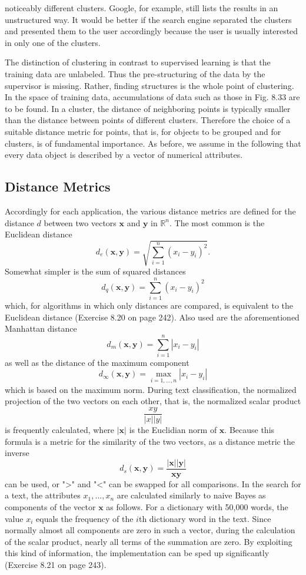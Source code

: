 \documentclass[10pt]{book}
\begin{document}
noticeably different clusters. Google, for example, still lists the results in an unstructured way. It would be better if the search engine separated the clusters and presented them to the user accordingly because the user is usually interested in only one of the clusters.

The distinction of clustering in contrast to supervised learning is that the training data are unlabeled. Thus the pre-structuring of the data by the supervisor is missing. Rather, finding structures is the whole point of clustering. In the space of training data, accumulations of data such as those in Fig. 8.33 are to be found. In a cluster, the distance of neighboring points is typically smaller than the distance between points of different clusters. Therefore the choice of a suitable distance metric for points, that is, for objects to be grouped and for clusters, is of fundamental importance. As before, we assume in the following that every data object is described by a vector of numerical attributes.

\subsection{Distance Metrics}
Accordingly for each application, the various distance metrics are defined for the distance $d$ between two vectors $\boldsymbol{x}$ and $\boldsymbol{y}$ in $\mathbb{R}^{n}$. The most common is the Euclidean distance
$$
d_{e}(\boldsymbol{x}, \boldsymbol{y})=\sqrt{\sum_{i=1}^{n}\left(x_{i}-y_{i}\right)^{2}} .
$$
Somewhat simpler is the sum of squared distances
$$
d_{q}(\boldsymbol{x}, \boldsymbol{y})=\sum_{i=1}^{n}\left(x_{i}-y_{i}\right)^{2}
$$
which, for algorithms in which only distances are compared, is equivalent to the Euclidean distance (Exercise 8.20 on page 242). Also used are the aforementioned Manhattan distance
$$
d_{m}(\boldsymbol{x}, \boldsymbol{y})=\sum_{i=1}^{n}\left|x_{i}-y_{i}\right|
$$
as well as the distance of the maximum component
$$
d_{\infty}(\boldsymbol{x}, \boldsymbol{y})=\max _{i=1, \ldots, n}\left|x_{i}-y_{i}\right|
$$
which is based on the maximum norm. During text classification, the normalized projection of the two vectors on each other, that is, the normalized scalar product
$$
\frac{x y}{|x||y|}
$$
is frequently calculated, where $|\boldsymbol{x}|$ is the Euclidian norm of $\boldsymbol{x}$. Because this formula is a metric for the similarity of the two vectors, as a distance metric the inverse
$$
d_{s}(\boldsymbol{x}, \boldsymbol{y})=\frac{|\boldsymbol{x}||\boldsymbol{y}|}{\boldsymbol{x} \boldsymbol{y}}
$$
can be used, or ">" and "<" can be swapped for all comparisons. In the search for a text, the attributes $x_{1}, \ldots, x_{n}$ are calculated similarly to naive Bayes as components of the vector $\boldsymbol{x}$ as follows. For a dictionary with 50,000 words, the value $x_{i}$ equals the frequency of the $i$th dictionary word in the text. Since normally almost all components are zero in such a vector, during the calculation of the scalar product, nearly all terms of the summation are zero. By exploiting this kind of information, the implementation can be sped up significantly (Exercise 8.21 on page 243).
\end{document}

